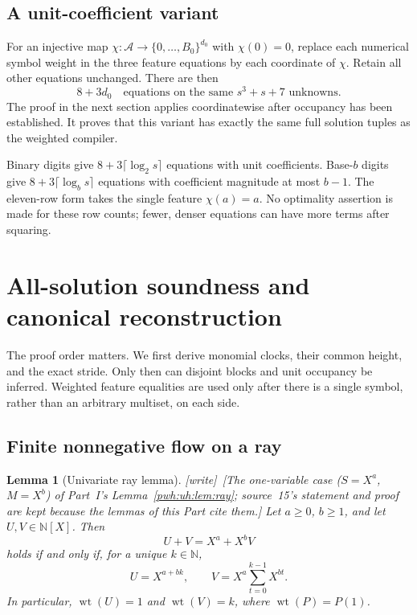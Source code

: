 \documentclass[11pt,letterpaper]{article}
\numberwithin{equation}{section}
\newtheorem{lemma}[theorem]{Lemma}
\theoremstyle{definition}
\newcommand{\N}{\mathbb N}
\newcommand{\A}{\mathcal A}
\newcommand{\wt}{\operatorname{wt}}
\newcommand{\wtag}{\textup{[write]}}
\begin{document}
\subsection{A unit-coefficient variant}

For an injective map
$\chi:\A\to\{0,\ldots,B_0\}^{d_0}$ with $\chi(0)=0$, replace each
numerical symbol weight in the three feature equations by each coordinate
of $\chi$. Retain all other equations unchanged. There are then
\begin{equation}
 8+3d_0\quad\text{equations on the same }s^3+s+7\text{ unknowns}.
 \label{pwh:oc:eq:featurecount}
\end{equation}
The proof in the next section applies coordinatewise after occupancy has
been established. It proves that this variant has exactly the same full
solution tuples as the weighted compiler.

Binary digits give $8+3\lceil\log_2s\rceil$ equations with unit
coefficients. Base-$b$ digits give $8+3\lceil\log_bs\rceil$ equations
with coefficient magnitude at most $b-1$. The eleven-row form takes the
single feature $\chi(a)=a$. No optimality assertion is made for these row
counts; fewer, denser equations can have more terms after squaring.

\section{All-solution soundness and canonical reconstruction}
\label{pwh:oc:sec:proof}

The proof order matters. We first derive monomial clocks, their common
height, and the exact stride. Only then can disjoint blocks and unit
occupancy be inferred. Weighted feature equalities are used only after
there is a single symbol, rather than an arbitrary multiset, on each side.

\subsection{Finite nonnegative flow on a ray}

\begin{lemma}[Univariate ray lemma]
\label{pwh:oc:lem:ray}
\wtag\ [The one-variable case ($S=X^a$, $M=X^b$) of Part~I's
Lemma~\ref{pwh:uh:lem:ray}; source~15's statement and proof are kept
because the lemmas of this Part cite them.]
Let $a\ge0$, $b\ge1$, and let $U,V\in\N[X]$. Then
\begin{equation}
 U+V=X^a+X^bV
 \label{pwh:oc:eq:ray}
\end{equation}
holds if and only if, for a unique $k\in\N$,
\[
 U=X^{a+bk},\qquad V=X^a\sum_{t=0}^{k-1}X^{bt}.
\]
In particular, $\wt(U)=1$ and $\wt(V)=k$, where $\wt(P)=P(1)$.
\end{lemma}
\end{document}

